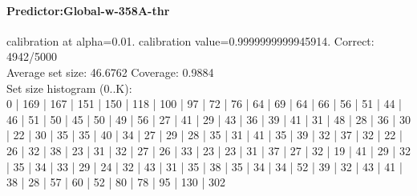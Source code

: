 \documentclass[parskip=half]{scrartcl}
\begin{document}
\paragraph{Predictor:Global-w-358A-thr} calibration at alpha=0.01. calibration value=0.9999999999945914. Correct: 4942/5000\\
Average set size: 46.6762   Coverage: 0.9884\\
Set size histogram (0..K):\\
0 | 169 | 167 | 151 | 150 | 118 | 100 | 97 | 72 | 76 | 64 | 69 | 64 | 66 | 56 | 51 | 44 | 46 | 51 | 50 | 45 | 50 | 49 | 56 | 27 | 41 | 29 | 43 | 36 | 39 | 41 | 31 | 48 | 28 | 36 | 30 | 22 | 30 | 35 | 35 | 40 | 34 | 27 | 29 | 28 | 35 | 31 | 41 | 35 | 39 | 32 | 37 | 32 | 22 | 26 | 32 | 38 | 23 | 31 | 32 | 27 | 26 | 33 | 23 | 23 | 31 | 37 | 27 | 32 | 19 | 41 | 29 | 32 | 35 | 34 | 33 | 29 | 24 | 32 | 43 | 31 | 35 | 38 | 35 | 34 | 34 | 52 | 39 | 32 | 43 | 41 | 38 | 28 | 57 | 60 | 52 | 80 | 78 | 95 | 130 | 302\\
\end{document}
